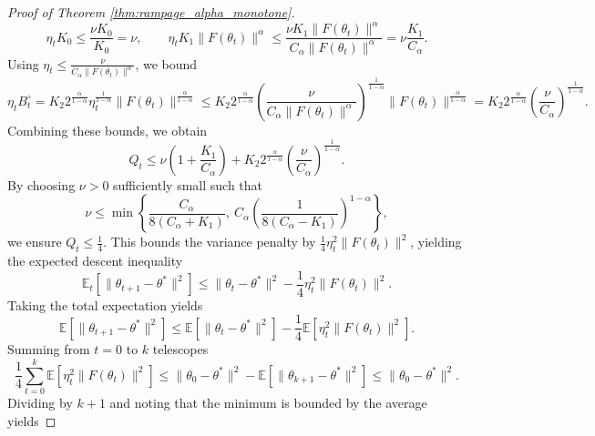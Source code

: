 \documentclass[letter,11pt]{article}
\begin{document}
\begin{proof}[Proof of Theorem \ref{thm:rampage_alpha_monotone}]
\begin{equation} \label{eq:rampage_alpha_q1_q2}
\eta_t K_0 \le \frac{\nu K_0}{K_0} = \nu, \qquad \eta_t K_1 \|F(\theta_t)\|^\alpha \le \frac{\nu K_1 \|F(\theta_t)\|^\alpha}{C_\alpha \|F(\theta_t)\|^\alpha} = \nu \frac{K_1}{C_\alpha}.
\end{equation}
Using $\eta_t \le \frac{\nu}{C_\alpha \|F(\theta_t)\|^\alpha}$, we bound
\begin{equation} \label{eq:rampage_alpha_q3}
\eta_t B_t^\circ = K_2 2^{\frac{\alpha}{1-\alpha}} \eta_t^{\frac{1}{1-\alpha}} \|F(\theta_t)\|^{\frac{\alpha}{1-\alpha}} \le K_2 2^{\frac{\alpha}{1-\alpha}} \left( \frac{\nu}{C_\alpha \|F(\theta_t)\|^\alpha} \right)^{\frac{1}{1-\alpha}} \|F(\theta_t)\|^{\frac{\alpha}{1-\alpha}} = K_2 2^{\frac{\alpha}{1-\alpha}} \left(\frac{\nu}{C_\alpha}\right)^{\frac{1}{1-\alpha}}.
\end{equation}
Combining these bounds, we obtain
\begin{equation}
Q_t \le \nu \left( 1 + \frac{K_1}{C_\alpha} \right) + K_2 2^{\frac{\alpha}{1-\alpha}} \left(\frac{\nu}{C_\alpha}\right)^{\frac{1}{1-\alpha}}.
\end{equation}
By choosing $\nu > 0$ sufficiently small such that
\begin{equation}
\nu \le \min \left\{ \frac{C_\alpha}{8(C_\alpha + K_1)}, \ C_\alpha \left( \frac{1}{8(C_\alpha - K_1)} \right)^{1-\alpha} \right\},
\end{equation}
we ensure $Q_t \le \frac{1}{4}$. This bounds the variance penalty by $\frac{1}{4}\eta_t^2 \|F(\theta_t)\|^2$, yielding the expected descent inequality
\begin{equation}
\mathbb{E}_t\left[\|\theta_{t+1} - \theta^*\|^2\right] \le \|\theta_t - \theta^*\|^2 - \frac{1}{4}\eta_t^2 \|F(\theta_t)\|^2.
\end{equation}
Taking the total expectation yields
\begin{equation}
\mathbb{E}\left[\|\theta_{t+1} - \theta^*\|^2\right] \le \mathbb{E}\left[\|\theta_t - \theta^*\|^2\right] - \frac{1}{4}\mathbb{E}\left[\eta_t^2 \|F(\theta_t)\|^2\right].
\end{equation}
Summing from $t=0$ to $k$ telescopes
\begin{equation}
\frac{1}{4} \sum_{t=0}^k \mathbb{E}\left[\eta_t^2 \|F(\theta_t)\|^2\right] \le \|\theta_0 - \theta^*\|^2 - \mathbb{E}\left[\|\theta_{k+1} - \theta^*\|^2\right] \le \|\theta_0 - \theta^*\|^2.
\end{equation}
Dividing by $k+1$ and noting that the minimum is bounded by the average yields

\end{proof}
\end{document}
